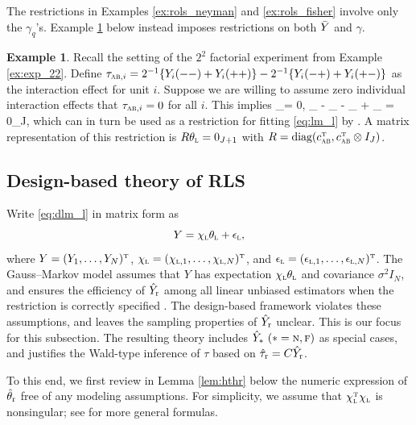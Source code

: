 \documentclass[11pt]{article}
\theoremstyle{definition}
\newtheorem{example}{Example}
\begin{document}
The restrictions in Examples \ref{ex:rols_neyman} and \ref{ex:rols_fisher} involve only the $\gamma_q$'s.  
Example \ref{ex:rols_no inter} below instead imposes restrictions on both $\bar Y$ and $\gamma$. 
 

 
\begin{example}\label{ex:rols_no inter}
Recall the setting of the $2^2$ factorial experiment from Example \ref{ex:exp_22}. Define $\tau_{\textsc{ab},i}=  2^{-1} \{Y_i(--)+ Y_i(++)\} - 2^{-1}\{ Y_i(-+) + Y_i(+-) \}$ as the interaction effect for unit $i$. Suppose we are willing to assume zero individual interaction effects that $\tau_{\textsc{ab},i}= 0$ for all $i$.  This implies
 \beginy
 \tau_\AB = 0, \qquad 
 \gamma_{\mmm\mmm} - \gamma_{\mmm\pp} - \gamma_{\pp\mmm} + \gamma_{\pp\pp} = 0_J, 
\label{eq:rest_l_22}  
 \endy
which can in turn be used as a restriction for fitting \eqref{eq:lm_l} by \rls. A matrix representation of this restriction is $R\theta_{\textsc{l}}   = 0_{J+1}$ with $
R = 
\text{diag}(
c^{ \mathrm{\scriptscriptstyle T} }_{\textsc{ab}},  c_{\textsc{ab}}^{ \mathrm{\scriptscriptstyle T} }\otimes  I_J)$.
\end{example}








\subsection{Design-based theory of RLS} \label{sec:rols_trt} 


Write \eqref{eq:dlm_l} in matrix form as 
$$
Y = \chi_{\textsc{l}}\theta_{\textsc{l}} + \epsilon_{\textsc{l}} ,
$$
where $Y = (Y_1, \dots, Y_N)^{ \mathrm{\scriptscriptstyle T} }$, $\chi_{\textsc{l}} = (\chi_{\textsc{l},1}, \dots, \chi_{\textsc{l},N})^{ \mathrm{\scriptscriptstyle T} }$, and $\epsilon_{\textsc{l}} = (\epsilon_{\textsc{l},1}, \dots, \epsilon_{\textsc{l},N})^{ \mathrm{\scriptscriptstyle T} }$. 
The Gauss--Markov model assumes that $Y$ has expectation $\chi_{\textsc{l}}\theta_{\textsc{l}}$ and covariance $\sigma^2 I_N$, 
and ensures the efficiency of $\hat Y_{\textup{r}}$ among all linear unbiased estimators when the restriction is correctly specified \citep{theil, rao}.
The design-based framework violates these assumptions, 
and leaves the sampling properties of $\hat Y_{\textup{r}}$ unclear. 
This is our focus for this subsection. 
The resulting theory includes $\hat Y_* \ ( * = \textsc{n}, \textsc{f})$ as special cases, and justifies the Wald-type inference of $\tau$ based on $\hat\tau_{\textup{r}} = C\hat Y_{\textup{r}}$. 

To this end, we first review in Lemma \ref{lem:hthr} below the numeric expression of $\hat\theta_{{\textup{r}} }$ free of any modeling assumptions. For simplicity, we assume that $\chi_{\textsc{l}}^{ \mathrm{\scriptscriptstyle T} } \chi_{\textsc{l}}$ is nonsingular; see \citet{greene} for more general formulas. 
\end{document}
